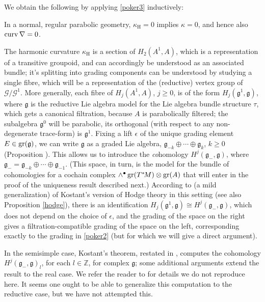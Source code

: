 \documentclass[leqno,12pt]{amsart} %
\begin{document}
We obtain the following by applying \eqref{poker3} inductively:
\begin{corollary}
  In a normal, regular parabolic geometry, $\kappa_{\mathrm H} =0$ implies $\kappa =0$,
  and hence also $\operatorname{curv} \nabla =0$.
\end{corollary}

The harmonic curvature $\kappa_{\mathrm H}$ is a section of $H_2(A^1, A)$, which is a
representation of a transitive groupoid, and can accordingly be understood as an
associated bundle; it's splitting into grading components can be understood by studying a
single fibre, which will be a representation of the (reductive) vertex group of
${\mathcal G}/{\mathcal G}^1$. More generally, each fibre of $H_j(A^1, A)$, $j \ge 0$, is
of the form $H_j({\mathfrak g}^1, {\mathfrak g})$, where ${\mathfrak g} $ is the reductive
Lie algebra model for the Lie algebra bundle structure $\tau $, which gets a canonical
filtration, because $A$ is parabolically filtered; the subalgebra ${\mathfrak g}^0$ will
be parabolic, its orthogonal (with respect to any non-degenerate trace-form) is
${\mathfrak g}^1$. Fixing a lift $\epsilon $ of the unique grading element
$E \in \operatorname{\operatorname{gr}}({\mathfrak g})$, we can write ${\mathfrak g}$ as a graded Lie algebra,
${\mathfrak g}_{-k} \oplus \cdots \oplus {\mathfrak g}_k$, $k\ge 0$ (Proposition
). This allows us to introduce the {\em co}homology
$H^j({\mathfrak g}_-, {\mathfrak g})$, where
${\mathfrak g}_- = {\mathfrak g}_{-k}\oplus \cdots \oplus {\mathfrak g}_{-1}$. (This
space, in turn, is the model for the bundle of cohomologies for a cochain complex
$\wedge^\bullet \operatorname{\operatorname{gr}}(T^*\!M)\otimes \operatorname{\operatorname{gr}}(A)$ that will enter in the proof of the
uniqueness result described next.) According to (a mild generalization) of Kostant's
version of Hodge theory in this setting \cite{Kostant_61} (see also Proposition
\ref{hodge}), there is an identification
$H_j({\mathfrak g}^1, {\mathfrak g}) \cong H^j({\mathfrak g}_-, {\mathfrak g})$, which
does not depend on the choice of $\epsilon $, and the grading of the space on the right
gives a filtration-compatible grading of the space on the left, corresponding exactly to
the grading in \eqref{poker2} (but for which we will give a direct argument).

In the semisimple case, Kostant's theorem, restated in \cite[Theorem 3.3.5,
p.~351]{Cap_Slovak_09}, computes the cohomology $H^j({\mathfrak g}_-, {\mathfrak g})_l$,
for each $l \in {\mathbb Z} $, for complex ${\mathfrak g} $; some additional arguments
extend the result to the real case. We refer the reader to \cite{Cap_Slovak_09} for
details we do not reproduce here. It seems one ought to be able to generalize this
computation to the reductive case, but we have not attempted this.
\end{document}
